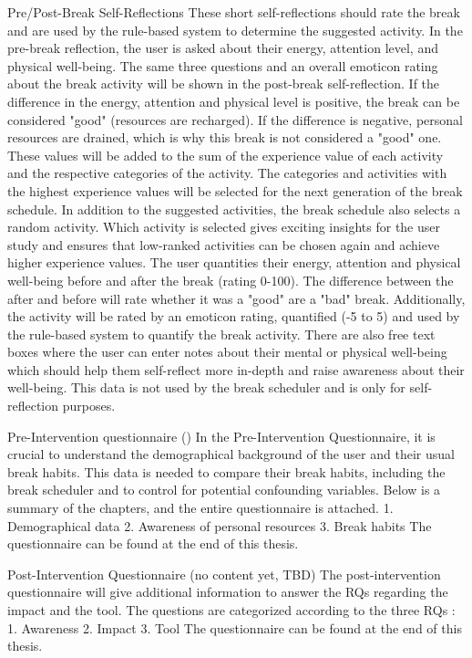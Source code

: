 \documentclass{hasel_thesis}
\begin{document}
Pre/Post-Break Self-Reflections
These short self-reflections should rate the break and are used by the rule-based system to determine the suggested activity. In the pre-break reflection, the user is asked about their energy, attention level, and physical well-being. The same three questions and an overall emoticon rating about the break activity will be shown in the post-break self-reflection. If the difference in the energy, attention and physical level is positive, the break can be considered "good" (resources are recharged). If the difference is negative, personal resources are drained, which is why this break is not considered a "good" one. These values will be added to the sum of the experience value of each activity and the respective categories of the activity. The categories and activities with the highest experience values will be selected for the next generation of the break schedule. In addition to the suggested activities, the break schedule also selects a random activity. Which activity is selected gives exciting insights for the user study and ensures that low-ranked activities can be chosen again and achieve higher experience values. The user quantities their energy, attention and physical well-being before and after the break (rating 0-100). The difference between the after and before will rate whether it was a "good" are a "bad" break.
Additionally, the activity will be rated by an emoticon rating, quantified (-5 to 5) and used by the rule-based system to quantify the break activity. There are also free text boxes where the user can enter notes about their mental or physical well-being which should help them self-reflect more in-depth and raise awareness about their well-being. This data is not used by the break scheduler and is only for self-reflection purposes.

Pre-Intervention questionnaire ()
In the Pre-Intervention Questionnaire, it is crucial to understand the demographical background of the user and their usual break habits. This data is needed to compare their break habits, including the break scheduler and to control for potential confounding variables. Below is a summary of the chapters, and the entire questionnaire is attached.
1.	Demographical data
2.	Awareness of personal resources
3.	Break habits
The questionnaire can be found at the end of this thesis.

Post-Intervention Questionnaire (no content yet, TBD)
The post-intervention questionnaire will give additional information to answer the RQs regarding the impact and the tool. The questions are categorized according to the three RQs : 
1.	Awareness
2.	Impact
3.	Tool
The questionnaire can be found at the end of this thesis.
\end{document}
